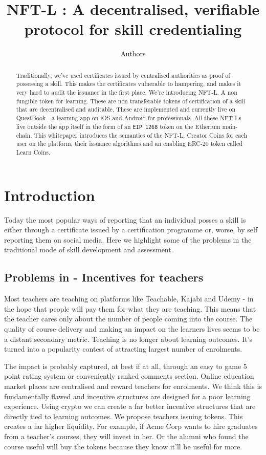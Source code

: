 \documentclass{article}
\author{Authors}
\title{NFT-L : A decentralised, verifiable protocol for skill credentialing}
\begin{document}
  \maketitle
  \begin{abstract}
    Traditionally, we've used certificates issued by centralised authorities as proof of possessing a skill.
    This makes the certificates vulnerable to hampering, and makes it very hard to audit the issuance in the first place.
    We're introducing NFT-L. A non fungible token for learning. These are non transferable tokens of certification of a skill that are decentralised and auditable.
    These are implemented and currently live on QuestBook - a learning app on iOS and Android for professionals. All these NFT-Ls live outside the app itself in the form of an \texttt{EIP 1268} token on the Etherium main-chain.
    This whitepaper introduces the semantics of the NFT-L, Creator Coins for each user on the platform, their issuance algorithms and an enabling ERC-20 token called Learn Coins.
  \end{abstract}
  \section{Introduction}
    Today the most popular ways of reporting that an individual posses a skill is either through a certificate issued by a certification programme or, worse, by self reporting them on social media.
    Here we highlight some of the problems in the traditional mode of skill development and assessment. 
    \subsection{Problems in - Incentives for teachers}
      Most teachers are teaching on platforms like Teachable, Kajabi and Udemy - in the hope that people will pay them for what they are teaching. 
      This means that the teacher cares only about the number of people coming into the course. The quality of course delivery and making an impact on the learners lives seems to be a distant secondary metric. Teaching is no longer about learning outcomes. It's turned into a popularity contest of attracting largest number of enrolments. 
   
      The impact is probably captured, at best if at all, through an easy to game 5 point rating system or conveniently ranked comments section.
      \break
       Online education market places are centralised and reward teachers for enrolments. We think this is fundamentally flawed and incentive structures are designed for a poor learning experience. Using crypto we can create a far better incentive structures that are directly tied to learning outcomes. We propose teachers issuing tokens. This creates a far higher liquidity. For example, if Acme Corp wants to hire graduates from a teacher's courses, they will invest in her. Or the alumni who found the course useful will buy the tokens because they know it'll be useful for more.
       
\end{document}
